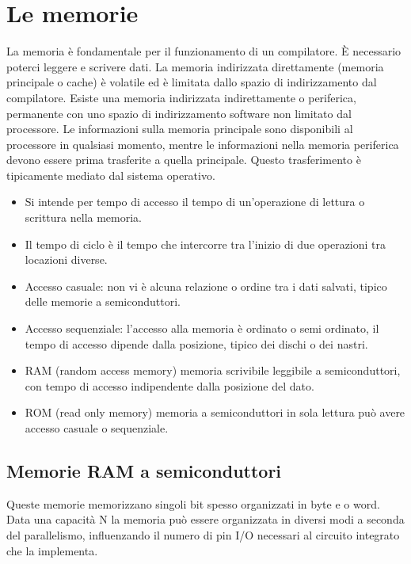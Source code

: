 \chapter{Le memorie}
La memoria \`e fondamentale per il funzionamento di un compilatore. \`E necessario poterci leggere e scrivere dati. La memoria indirizzata direttamente (memoria 
principale o cache) \`e volatile ed \`e limitata dallo spazio di indirizzamento dal compilatore. Esiste una memoria indirizzata indirettamente o periferica, permanente
con uno spazio di indirizzamento software non limitato dal processore. Le informazioni sulla memoria principale sono disponibili al processore in qualsiasi momento, 
mentre le informazioni nella memoria periferica devono essere prima trasferite a quella principale. Questo trasferimento \`e tipicamente mediato dal sistema operativo.
\begin{itemize}
\item Si intende per tempo di accesso il tempo di un'operazione di lettura o scrittura nella memoria.
\item Il tempo di ciclo \`e il tempo che intercorre tra l'inizio di due operazioni tra locazioni diverse.
\item Accesso casuale: non vi \`e alcuna relazione o ordine tra i dati salvati, tipico delle memorie a semiconduttori.
\item Accesso sequenziale: l'accesso alla memoria \`e ordinato o semi ordinato, il tempo di accesso dipende dalla posizione, tipico dei dischi o dei nastri.
\item RAM (random access memory) memoria scrivibile leggibile a semiconduttori, con tempo di accesso indipendente dalla posizione del dato.
\item ROM (read only memory) memoria a semiconduttori in sola lettura pu\`o avere accesso casuale o sequenziale. 
\end{itemize}
\section{Memorie RAM a semiconduttori}
Queste memorie memorizzano singoli bit spesso organizzati in byte e o word. Data una capacit\`a N la memoria pu\`o essere organizzata in diversi modi a seconda del
parallelismo, influenzando il numero di pin I/O necessari al circuito integrato che la implementa.
